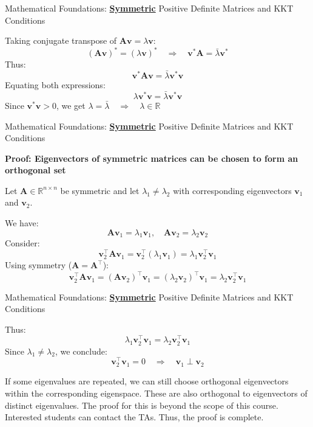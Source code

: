 \documentclass{beamer}
\begin{document}
\begin{frame}{Mathematical Foundations: \textbf{\underline{Symmetric}} Positive Definite Matrices and KKT Conditions}

Taking conjugate transpose of $\bm{A}\bm{v} = \lambda \bm{v}$:
\[
(\bm{A}\bm{v})^* = (\lambda \bm{v})^* \quad \Rightarrow \quad \bm{v}^* \bm{A} = \bar{\lambda} \bm{v}^*
\]
Thus:
\[
\bm{v}^* \bm{A} \bm{v} = \bar{\lambda} \bm{v}^* \bm{v}
\]
Equating both expressions:
\[
\lambda \bm{v}^* \bm{v} = \bar{\lambda} \bm{v}^* \bm{v}
\]
Since $\bm{v}^* \bm{v} > 0$, we get $\boxed{\lambda = \bar{\lambda} \quad \Rightarrow \quad \lambda \in \mathbb{R}}$


\end{frame}

\begin{frame}{Mathematical Foundations: \textbf{\underline{Symmetric}} Positive Definite Matrices and KKT Conditions}

\textbf{Proof: Eigenvectors of symmetric matrices can be chosen to form an orthogonal set}

Let $\bm{A} \in \mathbb{R}^{n \times n}$ be symmetric and let $\lambda_1 \neq \lambda_2$ with corresponding eigenvectors $\bm{v}_1$ and $\bm{v}_2$.

We have:
\[
\bm{A}\bm{v}_1 = \lambda_1 \bm{v}_1, \quad \bm{A}\bm{v}_2 = \lambda_2 \bm{v}_2
\]
Consider:
\[
\bm{v}_2^{\top} \bm{A} \bm{v}_1 = \bm{v}_2^{\top} (\lambda_1 \bm{v}_1) = \lambda_1 \bm{v}_2^{\top} \bm{v}_1
\]
Using symmetry ($\bm{A} = \bm{A}^{\top}$):
\[
\bm{v}_2^{\top} \bm{A} \bm{v}_1 = (\bm{A} \bm{v}_2)^{\top} \bm{v}_1 = (\lambda_2 \bm{v}_2)^{\top} \bm{v}_1 = \lambda_2 \bm{v}_2^{\top} \bm{v}_1
\]

\end{frame}

\begin{frame}{Mathematical Foundations: \textbf{\underline{Symmetric}} Positive Definite Matrices and KKT Conditions}

Thus:
\[
\lambda_1 \bm{v}_2^{\top} \bm{v}_1 = \lambda_2 \bm{v}_2^{\top} \bm{v}_1
\]
Since $\lambda_1 \neq \lambda_2$, we conclude:
\[
\boxed{\bm{v}_2^{\top} \bm{v}_1 = 0 \quad \Rightarrow \quad \bm{v}_1 \perp \bm{v}_2}
\]

If some eigenvalues are repeated, we can still choose orthogonal eigenvectors within the corresponding eigenspace. These are also orthogonal to eigenvectors of distinct eigenvalues. The proof for this is beyond the scope of this course. Interested students can contact the TAs.
\vspace{0.3cm}
Thus, the proof is complete.

\end{frame}
\end{document}
